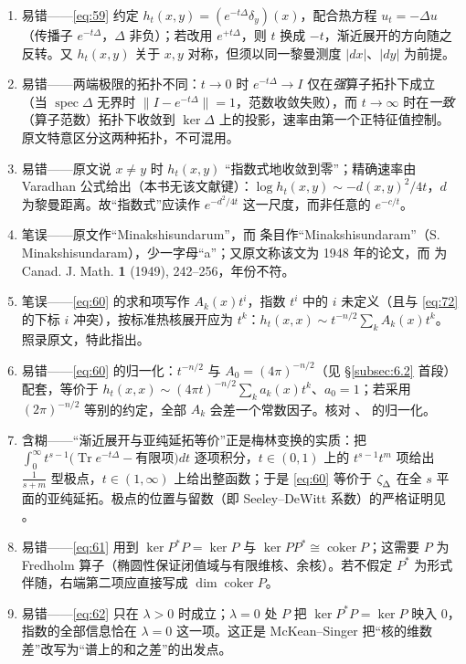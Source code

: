 \documentclass[11pt]{amsart}
\theoremstyle{definition}
\theoremstyle{remark}
\theoremstyle{plain}
\numberwithin{equation}{section}
\renewcommand{\:}{\colon}
\DeclareMathOperator{\Tr}{Tr}
\DeclareMathOperator{\coker}{coker}
\DeclareRobustCommand{\mstrut}{^{\vphantom{1*\prime y\vee M}}}
\DeclareMathOperator{\spec}{spec}
\newcommand{\zD}{\zeta \mstrut _\Delta }
\begin{document}
\begin{enumerate}[leftmargin=2.2em,itemsep=2pt,topsep=2pt]
  \item 易错——\eqref{eq:59} 约定 $h_t(x,y)=(e^{-t\Delta}\delta_y)(x)$，配合热方程 $u_t=-\Delta u$（传播子 $e^{-t\Delta}$，$\Delta$ 非负）；若改用 $e^{+t\Delta}$，则 $t$ 换成 $-t$，渐近展开的方向随之反转。又 $h_t(x,y)$ 关于 $x,y$ 对称，但须以同一黎曼测度 $|dx|$、$|dy|$ 为前提。
  \item 易错——两端极限的拓扑不同：$t\to0$ 时 $e^{-t\Delta}\to I$ 仅在\emph{强}算子拓扑下成立（当 $\spec\Delta$ 无界时 $\|I-e^{-t\Delta}\|=1$，范数收敛失败），而 $t\to\infty$ 时在\emph{一致}（算子范数）拓扑下收敛到 $\ker\Delta$ 上的投影，速率由第一个正特征值控制。原文特意区分这两种拓扑，不可混用。
  \item 易错——原文说 $x\neq y$ 时 $h_t(x,y)$ “指数式地收敛到零”；精确速率由 Varadhan 公式给出（本书无该文献键）：$\log h_t(x,y)\sim -d(x,y)^2/4t$，$d$ 为黎曼距离。故“指数式”应读作 $e^{-d^2/4t}$ 这一尺度，而非任意的 $e^{-c/t}$。
  \item 笔误——原文作“Minakshisundarum”，而 \cite{MP} 条目作“Minakshisundaram”（S. Minakshisundaram），少一字母“a”；又原文称该文为 1948 年的论文，而 \cite{MP} 为 Canad. J. Math. \textbf{1} (1949), 242–256，年份不符。
  \item 笔误——\eqref{eq:60} 的求和项写作 $A_k(x)t^i$，指数 $t^i$ 中的 $i$ 未定义（且与 \eqref{eq:72} 的下标 $i$ 冲突），按标准热核展开应为 $t^k$：$h_t(x,x)\sim t^{-n/2}\sum_k A_k(x)t^k$。照录原文，特此指出。
  \item 易错——\eqref{eq:60} 的归一化：$t^{-n/2}$ 与 $A_0=(4\pi)^{-n/2}$（见 §\ref{subsec:6.2} 首段）配套，等价于 $h_t(x,x)\sim(4\pi t)^{-n/2}\sum_k a_k(x)t^k$、$a_0=1$；若采用 $(2\pi)^{-n/2}$ 等别的约定，全部 $A_k$ 会差一个常数因子。核对 \cite{MP}、\cite{MS} 的归一化。
  \item 含糊——“渐近展开与亚纯延拓等价”正是梅林变换的实质：把 $\int_0^\infty t^{s-1}\bigl(\Tr e^{-t\Delta}-\text{有限项}\bigr)dt$ 逐项积分，$t\in(0,1)$ 上的 $t^{s-1}t^{m}$ 项给出 $\frac{1}{s+m}$ 型极点，$t\in(1,\infty)$ 上给出整函数；于是 \eqref{eq:60} 等价于 $\zD$ 在全 $s$ 平面的亚纯延拓。极点的位置与留数（即 Seeley–DeWitt 系数）的严格证明见 \cite{MP,Se4}。
  \item 易错——\eqref{eq:61} 用到 $\ker P^*P=\ker P$ 与 $\ker PP^*\cong\coker P$；这需要 $P$ 为 Fredholm 算子（椭圆性保证闭值域与有限维核、余核）。若不假定 $P^*$ 为形式伴随，右端第二项应直接写成 $\dim\coker P$。
  \item 易错——\eqref{eq:62} 只在 $\lambda>0$ 时成立；$\lambda=0$ 处 $P$ 把 $\ker P^*P=\ker P$ 映入 $0$，指数的全部信息恰在 $\lambda=0$ 这一项。这正是 McKean–Singer 把“核的维数差”改写为“谱上的和之差”的出发点。

\end{enumerate}
\end{document}
